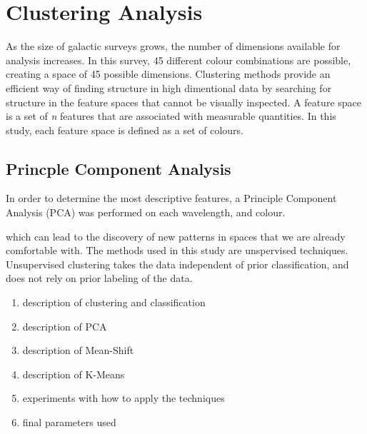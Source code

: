 \section{Clustering Analysis}
As the size of galactic surveys grows, the number of dimensions available for analysis increases.
In this survey, 45 different colour combinations are possible, creating a space of 45 possible dimensions. 
Clustering methods provide an efficient way of finding structure in high dimentional data by searching for structure in the feature spaces that cannot be visually inspected. 
A feature space is a set of \textit{n} features that are associated with measurable quantities. 
In this study, each feature space is defined as a set of colours.

\subsection{Princple Component Analysis}
In order to determine the most descriptive features, a Principle Component Analysis (PCA) was performed on each wavelength, and colour. %



 which can lead to the discovery of new patterns in spaces that we are already comfortable with. 
The methods used in this study are unspervised techniques. Unsupervised clustering takes the data independent of prior classification, and does not rely on prior labeling of the data.

\begin{enumerate}
\item description of clustering and classification 
\item description of PCA
\item description of Mean-Shift
\item description of K-Means
\item experiments with how to apply the techniques
\item final parameters used
\end{enumerate}
